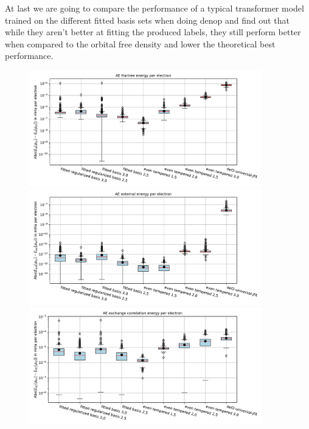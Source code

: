  At last we are going to compare the performance of a typical transformer model trained on the different fitted basis sets when doing denop and find out that while they aren't better at fitting the produced labels, they still perform better when compared to the orbital free density and lower the theoretical best performance.

\begin{figure}
    \centering
    \includegraphics[width=0.9\textwidth]{chapters/results/results_images/AE_hartree_energy_on_hartree+external_MOFDFT_for_different_basis_sets}
    \includegraphics[width=0.9\textwidth]{chapters/results/results_images/AE_ext_energy_on_hartree+external_MOFDFT_for_different_basis_sets}
    \includegraphics[width=0.9\textwidth]{chapters/results/results_images/AE_xc_energy_on_hartree+external_MOFDFT_for_different_basis_sets}

\end{figure}
